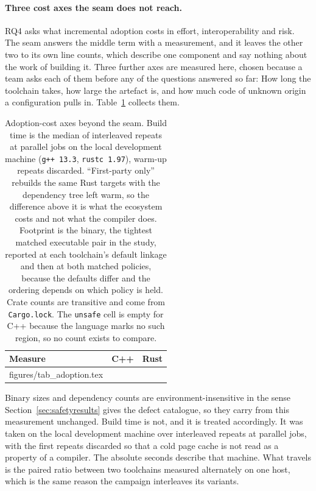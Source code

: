 \documentclass[english,oneside,a4paper,censored,csm,software-track-2020]{HYthesisML}
\makeatletter
\newcommand{\gentablebody}[1]{\@@input #1\relax}
\makeatother
\begin{document}
\paragraph{Three cost axes the seam does not reach.}
RQ4 asks what incremental adoption costs in effort, interoperability and risk. The seam answers
the middle term with a measurement, and it leaves the other two to its own line counts, which
describe one component and say nothing about the work of building it. Three further axes are
measured here, chosen because a team asks each of them before any of the questions answered so
far: How long the toolchain takes, how large the artefact is, and how much code of unknown origin
a configuration pulls in. Table~\ref{tab:adoption} collects them.

\begin{table}[tp]
\centering
\small
\caption[Adoption-cost axes: build time, static footprint, third-party surface]{Adoption-cost
axes beyond the seam. Build time is the median of \AdoptRepeats{} interleaved repeats at
\AdoptJobs{} parallel jobs on the local development machine (\texttt{g++~13.3},
\texttt{rustc~1.97}), warm-up repeats discarded. ``First-party only'' rebuilds the same Rust
targets with the dependency tree left warm, so the difference above it is what the ecosystem
costs and not what the compiler does. Footprint is the \texttt{\FootTarget} binary, the tightest
matched executable pair in the study, reported at each toolchain's default linkage and then at
both matched policies, because the defaults differ and the ordering depends on which policy is
held. Crate counts are transitive and come from \texttt{Cargo.lock}. The \texttt{unsafe} cell is
empty for C++ because the language marks no such region, so no count exists to
compare.\label{tab:adoption}}
\begin{tabular}{@{}l r r@{}}
\hline\hline
Measure & C++ & Rust \\
\hline
\gentablebody{figures/tab_adoption.tex}\\
\hline
\end{tabular}
\end{table}

Binary sizes and dependency counts are environment-insensitive in the sense
Section~\ref{sec:safetyresults} gives the defect catalogue, so they carry from this measurement
unchanged. Build time is not, and it is treated accordingly. It was taken on the local development
machine over \AdoptRepeats{} interleaved repeats at \AdoptJobs{} parallel jobs, with the first
repeats discarded so that a cold page cache is not read as a property of a compiler. The absolute
seconds describe that machine. What travels is the paired ratio between two toolchains measured
alternately on one host, which is the same reason the campaign interleaves its variants.
\end{document}
